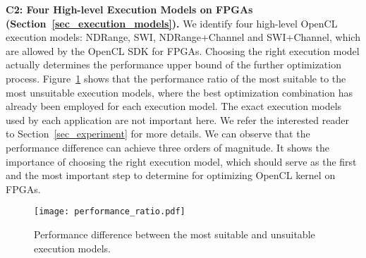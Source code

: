 \vspace{0.4em}
\noindent
{\bf C2: Four High-level Execution Models on FPGAs (Section~\ref{sec_execution_models}). }We identify four high-level OpenCL execution models: NDRange, SWI, NDRange+Channel and SWI+Channel, which are allowed by the OpenCL SDK for FPGAs. Choosing the right execution model actually determines the performance upper bound of the further optimization process. Figure~\ref{fig_intro_performance_difference} shows that the performance ratio of the most suitable to the most unsuitable execution models, where the best optimization combination has already been employed for each execution model. The exact execution models used by each application are not important here. We refer the interested reader to Section~\ref{sec_experiment} for more details. We can observe that the performance difference can achieve three orders of magnitude. It shows the importance of choosing the right execution model, which should serve as the first and the most important step to determine for optimizing OpenCL kernel on FPGAs. %
\begin{figure}
	\centering
	\texttt{[image: performance\_ratio.pdf]}
	\vspace{-2.0ex}
	\caption{Performance difference between the most suitable and unsuitable execution models.}%
	\vspace{-2ex}
	\label{fig_intro_performance_difference}
\end{figure} 


